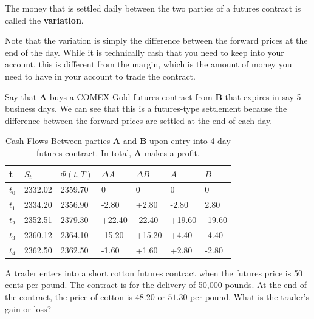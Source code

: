 \documentclass{article}
\begin{document}
      \begin{definition}[Variation]
        \label{def:variation}
        The money that is settled daily between the two parties of a futures contract is called the \textbf{variation}. 
      \end{definition}

      Note that the variation is simply the difference between the forward prices at the end of the day. While it is technically cash that you need to keep into your account, this is different from the margin, which is the amount of money you need to have in your account to trade the contract. 

      \begin{example}
        \label{ex:futures-type-settlement}
        Say that \textbf{A} buys a COMEX Gold futures contract from \textbf{B} that expires in say 5 business days. We can see that this is a futures-type settlement because the difference between the forward prices are settled at the end of each day. 

        \begin{table}[H]
          \centering
          \begin{tabular}{|l|l|l|l|l|l|l|}
          \hline
          t & $S_t$ & $\Phi(t, T)$ & $\Delta A$ & $\Delta B$ & $A$ & $B$ \\ \hline 
          $t_0$ & 2332.02 & 2359.70 & 0 & 0 & 0 & 0 \\ \hline
          $t_1$ & 2334.20 & 2356.90 & -2.80 & +2.80 & -2.80 & 2.80 \\ \hline
          $t_2$ & 2352.51 & 2379.30 & +22.40 & -22.40 & +19.60 & -19.60 \\ \hline
          $t_3$ & 2360.12 & 2364.10 & -15.20 & +15.20 & +4.40 & -4.40 \\ \hline
          $t_4$ & 2362.50 & 2362.50 & -1.60 & +1.60 & +2.80 & -2.80 \\ \hline 
          \end{tabular}
          \caption{Cash Flows Between parties \textbf{A} and \textbf{B} upon entry into 4 day futures contract. In total, \textbf{A} makes a profit. }
          \label{tab:futures_gold_example}
        \end{table}
      \end{example}

      \begin{exercise}[Hull 1.6]
        A trader enters into a short cotton futures contract when the futures price is 50 cents per pound. The contract is for the delivery of 50,000 pounds. At the end of the contract, the price of cotton is $48.20$ or $51.30$ per pound. What is the trader's gain or loss?
      \end{exercise}
\end{document}
